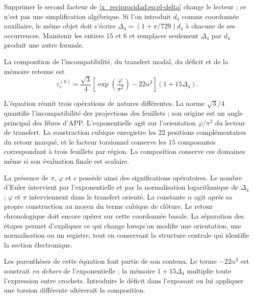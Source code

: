 \begin{remark}
Supprimer le second facteur de \eqref{x_reciprocidad:eq:el-delta} change le lecteur ; ce n'est pas une simplification algébrique. Si l'on introduit \(d_4\) comme coordonnée auxiliaire, le même objet doit s'écrire \(\Delta_4=(1+\pi/729)d_4\) à chacune de ses occurrences. Maintenir les entiers \(15\) et \(6\) et remplacer seulement \(\Delta_4\) par \(d_4\) produit une autre formule.
\end{remark}

\begin{definition}
La composition de l'incompatibilité, du transfert modal, du déficit et de la mémoire retenue
est
\begin{equation}
 \varepsilon_e^{(0)}
 =\frac{\sqrt3}{4}
  \left[\exp\!\left(\frac{\varphi}{\pi^2}\right)-22\alpha^3\right]
  (1+15\Delta_4).
 \label{x_reciprocidad:eq:el-basal}
\end{equation}
\end{definition}

L'équation réunit trois opérations de natures différentes. La norme
\(\sqrt3/4\) quantifie l'incompatibilité des projections des
feuillets ; son origine est un angle principal des fibres d'APP.
L'exponentielle agit sur l'orientation \(\varphi/\pi^2\) du
lecteur de transfert. La soustraction cubique enregistre les \(22\) positions
complémentaires du retour marqué, et le facteur torsionnel conserve les
\(15\) composantes correspondant à trois feuillets par région. La
composition conserve ces domaines même si son évaluation finale est scalaire.

La présence de \(\pi\), \(\varphi\) et \(e\) possède ainsi des significations
opératoires. Le nombre d'Euler intervient par l'exponentielle et par
la normalisation logarithmique de \(\Delta_4\) ; \(\varphi\) et \(\pi\)
interviennent dans le transfert orienté. La constante \(\alpha\)
agit après sa propre construction au moyen du terme cubique
de clôture. Le retour chronologique doit encore opérer sur cette coordonnée
basale. La séparation des étapes permet d'expliquer ce qui change lorsqu'on modifie
une orientation, une normalisation ou un registre, tout en conservant la structure
centrale qui identifie la section électronique.

Les parenthèses de cette équation font partie de son contenu. Le terme \(-22\alpha^3\) est soustrait \emph{en dehors} de l'exponentielle ; la mémoire \(1+15\Delta_4\) multiplie toute l'expression entre crochets. Introduire le déficit dans l'exposant ou lui appliquer une torsion différente altérerait la composition.

